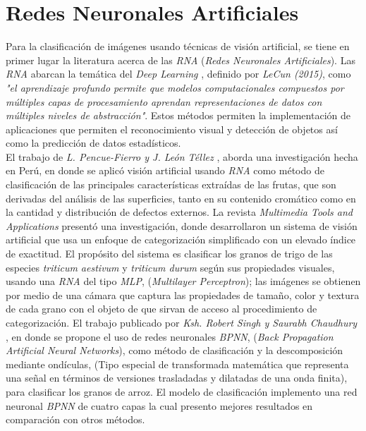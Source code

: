 \section{Redes Neuronales Artificiales}

Para la clasificación de imágenes usando técnicas de visión artificial, se tiene en primer lugar la literatura  acerca de las \textit{RNA} (\textit{Redes Neuronales Artificiales}). Las \textit{RNA} abarcan la temática del \textit{Deep Learning} \cite{lecun2015deep}, definido por \textit{LeCun (2015)}, como \textit{"el aprendizaje profundo permite que modelos computacionales compuestos por múltiples capas de procesamiento aprendan representaciones de datos con múltiples niveles de abstracción"}. Estos métodos permiten la implementación de aplicaciones que permiten el reconocimiento visual y detección de objetos así como la predicción de datos estadísticos.\\ 

El trabajo de \textit{L. Pencue-Fierro y J. León Téllez} \cite{article2}, aborda una investigación hecha en Perú, en donde se aplicó visión artificial usando \textit{RNA} como método de clasificación de las principales características extraídas de las frutas, que son derivadas del análisis de las superficies, tanto en su contenido cromático como en la cantidad y distribución de defectos externos. La revista \textit{Multimedia Tools and Applications} \cite{Shrivastava2017} presentó una investigación, donde desarrollaron un sistema de visión artificial que usa un enfoque de categorización simplificado con un elevado índice de exactitud. El propósito del sistema es clasificar los granos de trigo de las especies \textit{triticum aestivum} y \textit{triticum durum} según sus propiedades visuales, usando una \textit{RNA} del tipo \textit{MLP}, (\textit{Multilayer Perceptron}); las imágenes se obtienen por medio de una cámara que captura las propiedades de tamaño, color y textura de cada grano con el objeto de que sirvan de acceso al procedimiento de categorización. El trabajo publicado por \textit{Ksh. Robert Singh y Saurabh Chaudhury} \cite{Singh2016}, en donde se propone el uso de redes neuronales \textit{BPNN}, (\textit{Back Propagation Artificial Neural Networks}), como método de clasificación y la descomposición mediante ondículas, (Tipo especial de transformada matemática que representa una señal en términos de versiones trasladadas y dilatadas de una onda finita), para clasificar los granos de arroz. El modelo de clasificación implemento una red neuronal \textit{BPNN} de cuatro capas la cual presento mejores resultados en comparación con otros métodos.\\

